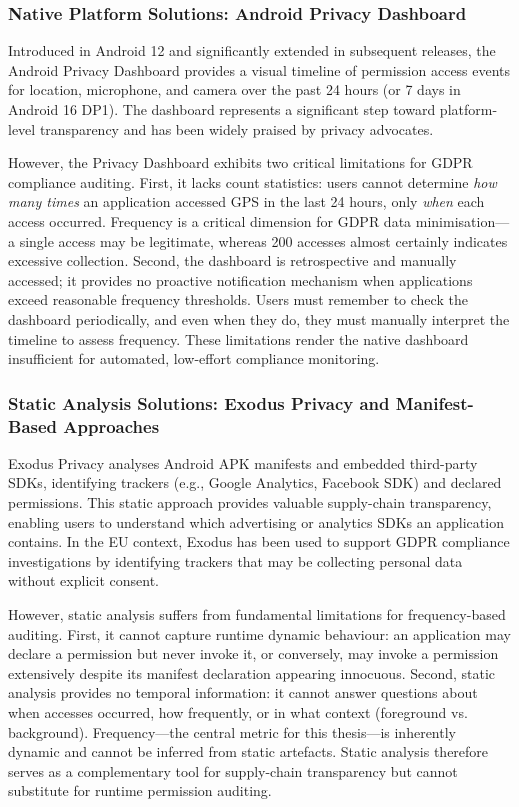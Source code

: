 \subsubsection{Native Platform Solutions: Android Privacy Dashboard}
Introduced in Android 12 and significantly extended in subsequent releases, the Android Privacy Dashboard provides a visual timeline of permission access events for location, microphone, and camera over the past 24 hours (or 7 days in Android 16 DP1). The dashboard represents a significant step toward platform-level transparency and has been widely praised by privacy advocates.

However, the Privacy Dashboard exhibits two critical limitations for GDPR compliance auditing. First, it lacks count statistics: users cannot determine \emph{how many times} an application accessed GPS in the last 24 hours, only \emph{when} each access occurred. Frequency is a critical dimension for GDPR data minimisation—a single access may be legitimate, whereas 200 accesses almost certainly indicates excessive collection. Second, the dashboard is retrospective and manually accessed; it provides no proactive notification mechanism when applications exceed reasonable frequency thresholds. Users must remember to check the dashboard periodically, and even when they do, they must manually interpret the timeline to assess frequency. These limitations render the native dashboard insufficient for automated, low-effort compliance monitoring.

\subsubsection{Static Analysis Solutions: Exodus Privacy and Manifest-Based Approaches}
Exodus Privacy analyses Android APK manifests and embedded third-party SDKs, identifying trackers (e.g., Google Analytics, Facebook SDK) and declared permissions. This static approach provides valuable supply-chain transparency, enabling users to understand which advertising or analytics SDKs an application contains. In the EU context, Exodus has been used to support GDPR compliance investigations by identifying trackers that may be collecting personal data without explicit consent.

However, static analysis suffers from fundamental limitations for frequency-based auditing. First, it cannot capture runtime dynamic behaviour: an application may declare a permission but never invoke it, or conversely, may invoke a permission extensively despite its manifest declaration appearing innocuous. Second, static analysis provides no temporal information: it cannot answer questions about when accesses occurred, how frequently, or in what context (foreground vs. background). Frequency—the central metric for this thesis—is inherently dynamic and cannot be inferred from static artefacts. Static analysis therefore serves as a complementary tool for supply-chain transparency but cannot substitute for runtime permission auditing.

